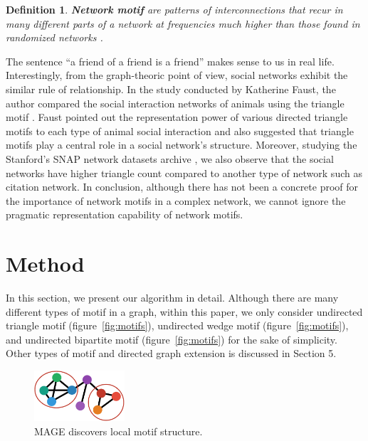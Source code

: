 \documentclass[letterpaper]{article}
\newtheorem{ntdef}{Definition}
\begin{document}
            \begin{ntdef}
                \textbf{Network motif} are patterns of interconnections that recur in many different
                parts of a network at frequencies much higher than those found in randomized networks
                \cite{motifblockmilo}.
            \end{ntdef}

            The sentence ``a friend of a friend is a friend'' makes sense to us in real life. Interestingly,
            from the graph-theoric point of view, social networks exhibit the similar rule of relationship.
            In the study conducted by Katherine Faust, the author compared the social interaction 
            networks of animals using the triangle motif \cite{comsocialnetwork}. Faust pointed
            out the representation power of various directed triangle motifs to each type of animal social
            interaction and also suggested that triangle motifs play a central role in a social network's
            structure. Moreover, studying the Stanford's SNAP network datasets archive \cite{SNAP}, 
            we also observe that the social networks have higher triangle count compared to another type of 
            network such as citation network. In conclusion, although there has not been a concrete proof 
            for the importance of network motifs in a complex network, we cannot ignore the pragmatic 
            representation capability of network motifs.

    \section{Method}

        In this section, we present our algorithm in detail. Although there are many different types of motif
        in a graph, within this paper, we only consider undirected triangle motif (figure~\ref{fig:motifs}),
        undirected wedge motif (figure~\ref{fig:motifs}), and undirected bipartite motif 
        (figure~\ref{fig:motifs}) for the sake of simplicity. Other types of motif and directed graph
        extension is discussed in Section 5.

        \begin{figure}
            \centering
            \includegraphics[width=0.3\textwidth]{fig5_mage}
            \caption{MAGE discovers local motif structure.}
            \label{fig:n2v}
        \end{figure}
\end{document}
